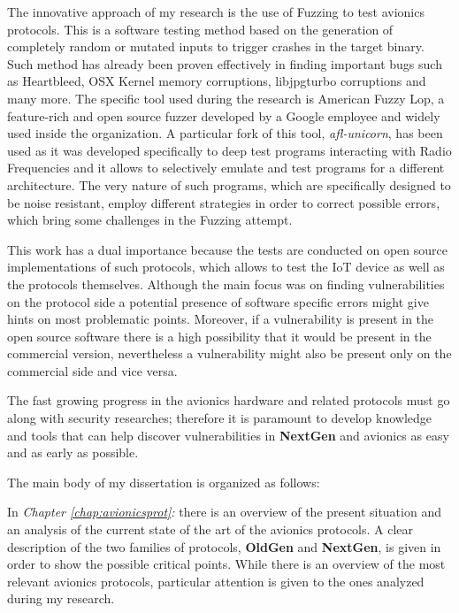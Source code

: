 \documentclass[../main.tex]{subfiles}
\begin{document}
The innovative approach of my research is the use of Fuzzing to test avionics protocols. This is a software testing method based on the generation of completely random or mutated inputs to trigger crashes in the target binary. Such method has already been proven effectively in finding important bugs such as Heartbleed, OSX Kernel memory corruptions, libjpgturbo corruptions and many more. The specific tool used during the research is American Fuzzy Lop, a feature-rich and open source fuzzer developed by a Google employee and widely used inside the organization. A particular fork of this tool, \textit{afl-unicorn}, has been used as it was developed specifically to deep test programs interacting with Radio Frequencies and it allows to selectively emulate and test programs for a different architecture.
The very nature of such programs, which are specifically designed to be noise resistant, employ different strategies in order to correct possible errors, which bring some challenges in the Fuzzing attempt.

This work has a dual importance because the tests are conducted on open source implementations of such protocols, which allows to test the IoT device as well as the protocols themselves. Although the main focus was on finding vulnerabilities on the protocol side a potential presence of software specific errors might give hints on most problematic points. Moreover, if a vulnerability is present in the open source software there is a high possibility that it would be present in the commercial version, nevertheless a vulnerability might also be present only on the commercial side and vice versa.

The fast growing progress in the avionics hardware and related protocols must go along with security researches; therefore it is paramount to develop knowledge and tools that can help discover vulnerabilities in \textbf{NextGen} and avionics as easy and as early as possible.


\bigskip \noindent
The main body of my dissertation is organized as follows:

\bigskip \noindent
In \textit{Chapter \ref{chap:avionicsprot}: } there is an overview of the present situation and an analysis of the current state of the art of the avionics protocols. A clear description of the two families of protocols, \textbf{OldGen} and \textbf{NextGen}, is given in order to show the possible critical points. While there is an overview of the most relevant avionics protocols, particular attention is given to the ones analyzed during my research.
\end{document}
